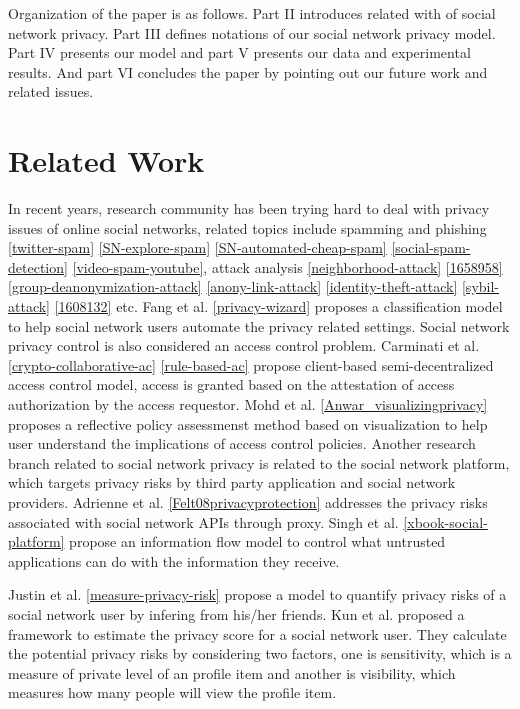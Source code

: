 \documentclass[a4paper]{article}
\begin{document}
Organization of the paper is as follows. Part II introduces related
with of social network privacy. Part III defines notations of our
social network privacy model. Part IV presents our model and part V
presents our data and experimental results. And part VI concludes the
paper by pointing out our future work and related issues. 

\section{Related Work\label{sec:relatedwork}}
In recent years, research community has been trying hard to deal with
privacy issues of online social networks, related topics include
spamming and phishing \ref{twitter-spam} \ref{SN-explore-spam}
\ref{SN-automated-cheap-spam} \ref{social-spam-detection}
\ref{video-spam-youtube}, attack analysis \ref{neighborhood-attack}
\ref{1658958} \ref{group-deanonymization-attack}
\ref{anony-link-attack} \ref{identity-theft-attack} \ref{sybil-attack}
\ref{1608132} etc.  Fang et al. \ref{privacy-wizard} proposes a
classification model to help social network users automate the privacy
related settings. Social network privacy control is also considered an
access control problem. Carminati et al. \ref{crypto-collaborative-ac}
\ref{rule-based-ac} propose client-based semi-decentralized access
control model, access is granted based on the attestation of access
authorization by the access requestor. Mohd et
al. \ref{Anwar_visualizingprivacy} proposes a reflective policy
assessmenst method based on visualization to help user understand the
implications of access control policies. Another research branch
related to social network privacy is related to the social network
platform, which targets privacy risks by third party application and
social network providers. Adrienne et
al. \ref{Felt08privacyprotection} addresses the privacy risks
associated with social network APIs through proxy. Singh et
al. \ref{xbook-social-platform} propose an information flow model to
control what untrusted applications can do with the information they
receive. 

Justin et al. \ref{measure-privacy-risk} propose a model to quantify
privacy risks of a social network user by infering from his/her
friends. Kun et al. \cite{SN-privacy-score} proposed a framework to
estimate the privacy score for a social network user. They calculate
the potential privacy risks by considering two factors, one is
sensitivity, which is a measure of private level of an profile item
and another is visibility, which measures how many people will view
the profile item.
\end{document}
